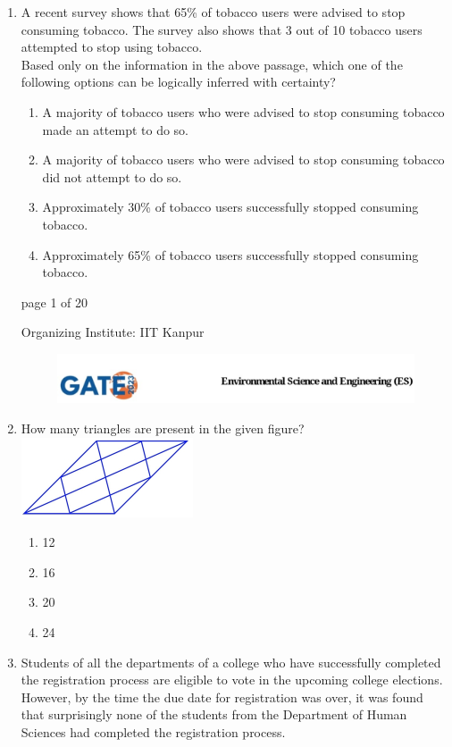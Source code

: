 \documentclass[journal,12pt,onecolumn]{IEEEtran}
\theoremstyle{remark}
\begin{document}
\begin{enumerate}[start=1, label={Q\arabic*.}]
\hfill{}
\item A recent survey shows that 65\% of tobacco users were advised to stop consuming tobacco. 
The survey also shows that 3 out of 10 tobacco users attempted to stop using tobacco. \\
Based only on the information in the above passage, which one of the following options can be logically inferred with certainty?
\begin{enumerate}[label=(\Alph*)]
\item A majority of tobacco users who were advised to stop consuming tobacco made an attempt to do so.
\item A majority of tobacco users who were advised to stop consuming tobacco did not attempt to do so.
\item Approximately 30\% of tobacco users successfully stopped consuming tobacco.
\item Approximately 65\% of tobacco users successfully stopped consuming tobacco.
\end{enumerate}
\hfill{}
\vfill
\begin{center}
{\Large page 1 of 20}
\end{center}
\RaggedRight
{\color{orange}
{\Large Organizing Institute: IIT Kanpur}}
\newpage
\begin{figure}
    
    \includegraphics[width=1\linewidth]{figs/latex.jpg}
    
\end{figure}
\item How many triangles are present in the given figure? \\
\includegraphics[width=0.4\textwidth]{figs/img 1.jpeg} 

\begin{enumerate}[label=(\Alph*)]
\item 12
\item 16
\item 20
\item 24
\end{enumerate}
\hfill{}
\item Students of all the departments of a college who have successfully completed the registration process are eligible to vote in the upcoming college elections. However, by the time the due date for registration was over, it was found that surprisingly none of the students from the Department of Human Sciences had completed the registration process. \\


\end{enumerate}
\end{document}
